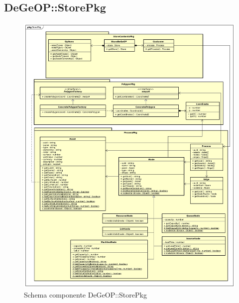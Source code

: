 \subsection{DeGeOP::StorePkg}
\label{pkg::StorePkg}
\begin{figure}[H]
	\centering
	\includegraphics[width=\textwidth]{img/PkgDiagram/StorePkg.png}
	\caption{Schema componente DeGeOP::StorePkg}
\end{figure}

